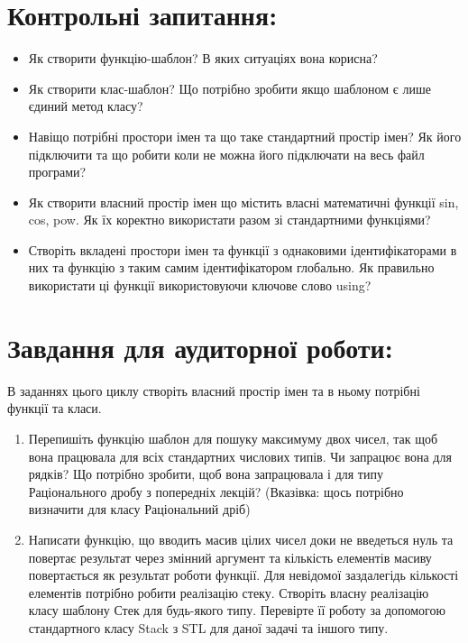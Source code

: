 \documentclass[a5paper,titlepage,openany,twoside,draft]{book_unv}%
\begin{document}
\section{Контрольні запитання:}
\begin{itemize}
\item
Як створити функцію-шаблон? В яких ситуаціях вона корисна?
\item
Як створити клас-шаблон? Що потрібно зробити якщо шаблоном є лише
єдиний метод класу?
\item
  Навіщо потрібні простори імен та що таке стандартний простір імен? Як
  його підключити та що робити коли не можна його підключати на весь
  файл програми?
\item
  Як створити власний простір імен що містить власні математичні функції
  sin, cos, pow. Як їх коректно використати разом зі стандартними
  функціями?
\item
  Створіть вкладені простори імен та функції з однаковими
  ідентифікаторами в них та функцію з таким самим ідентифікатором
  глобально. Як правильно використати ці функції використовуючи ключове
  слово using?
\end{itemize}

\section{Завдання для аудиторної роботи:}

В заданнях цього циклу створіть власний простір імен та в ньому 
потрібні функції та класи.  

\begin{enumerate}
\def\labelenumi{\arabic{enumi})}

\item
  Перепишіть функцію шаблон для пошуку максимуму двох чисел,
  так щоб вона працювала для всіх стандартних числових типів. 
Чи запрацює вона для рядків? 
Що потрібно зробити, щоб вона запрацювала і для типу 
Раціонального дробу з попередніх лекцій? 
(Вказівка: щось потрібно визначити для класу Раціональний дріб)

\item 
 Написати функцію, що вводить масив цілих чисел доки не введеться нуль 
та повертає результат через змінний аргумент та 
кількість елементів масиву повертається як
результат роботи функції. Для невідомої заздалегідь кількості елементів потрібно 
  робити реалізацію стеку. 
Створіть власну реалізацію класу шаблону Стек для будь-якого типу. Перевірте її роботу за
  допомогою стандартного класу Stack з STL для даної задачі та іншого типу.



\end{enumerate}
\end{document}

